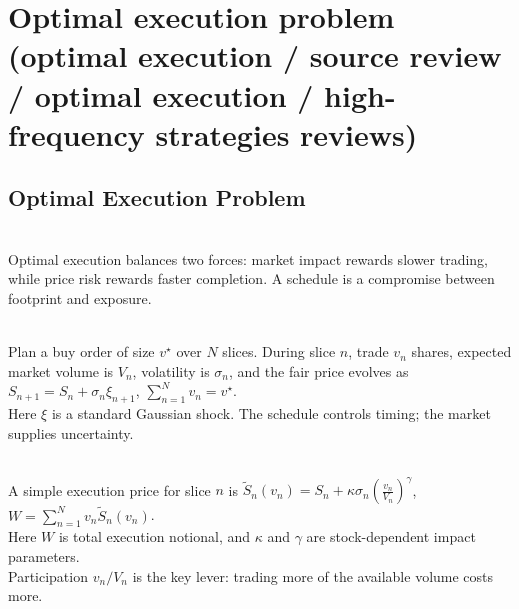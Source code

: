 \documentclass[a4paper,oneside,openany]{book}
\begin{document}
\section*{Optimal execution problem (optimal execution / source review / optimal execution / high-frequency strategies reviews)}

\subsection*{Optimal Execution Problem}

\begin{principle} \\
Optimal execution balances two forces: market impact rewards slower trading, while price risk rewards faster completion. A schedule is a compromise between footprint and exposure.
\end{principle}

\begin{model} \\
Plan a buy order of size $v^\star$ over $N$ slices. During slice $n$, trade $v_n$ shares, expected market volume is $V_n$, volatility is $\sigma_n$, and the fair price evolves as $S_{n+1}=S_n+\sigma_n\xi_{n+1}$, $\sum\limits_{n=1}^{N}v_n=v^\star$.\\
Here $\xi$ is a standard Gaussian shock. The schedule controls timing; the market supplies uncertainty.
\end{model}

\begin{model} \\
A simple execution price for slice $n$ is $\widetilde{S}_n(v_n)=S_n+\kappa\sigma_n\left(\frac{v_n}{V_n}\right)^\gamma$, $W=\sum\limits_{n=1}^{N}v_n\widetilde{S}_n(v_n)$.\\
Here $W$ is total execution notional, and $\kappa$ and $\gamma$ are stock-dependent impact parameters.\\
Participation $v_n/V_n$ is the key lever: trading more of the available volume costs more.
\end{model}
\end{document}

